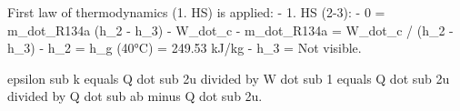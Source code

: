 First law of thermodynamics (1. HS) is applied:  
- 1. HS (2-3):  
  - 0 = m_dot_R134a (h_2 - h_3) - W_dot_c  
  - m_dot_R134a = W_dot_c / (h_2 - h_3)  
- h_2 = h_g (40°C) = 249.53 kJ/kg  
- h_3 = Not visible.

epsilon sub k equals Q dot sub 2u divided by W dot sub 1 equals Q dot sub 2u divided by Q dot sub ab minus Q dot sub 2u.